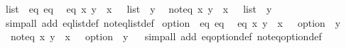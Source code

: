 \begin{isabellebody}
\endisatagproof
{\isafoldproof}%
%
\isadelimproof
%
\endisadelimproof
\isanewline
\isanewline
{}\isamarkupfalse%
\isanewline
\isanewline
{}\isamarkupfalse%
\ list\ {\isacharcolon}{\isacharcolon}\ {\isacharparenleft}eq{\isacharparenright}\ eq\isanewline
{}\isanewline
\isanewline
{}\isamarkupfalse%
\isanewline
\ \ {\isachardoublequoteopen}eq\ x\ y\ {\isasymlongleftrightarrow}\ {\isacharparenleft}x\ {\isacharcolon}{\isacharcolon}\ {\isacharunderscore}\ list{\isacharparenright}\ {\isacharequal}\ y{\isachardoublequoteclose}\isanewline
\isanewline
{}\isamarkupfalse%
\isanewline
\ \ {\isachardoublequoteopen}not{\isacharunderscore}eq\ x\ y\ {\isasymlongleftrightarrow}\ {\isacharparenleft}x\ {\isacharcolon}{\isacharcolon}\ {\isacharunderscore}\ list{\isacharparenright}\ {\isasymnoteq}\ y{\isachardoublequoteclose}\isanewline
\isanewline
{}\isamarkupfalse%
%
\isadelimproof
\ %
\endisadelimproof
%
\isatagproof
{}\isamarkupfalse%
\isanewline
{}\isamarkupfalse%
\ {\isacharparenleft}simp{\isacharunderscore}all\ add{\isacharcolon}\ eq{\isacharunderscore}list{\isacharunderscore}def\ not{\isacharunderscore}eq{\isacharunderscore}list{\isacharunderscore}def{\isacharparenright}%
\endisatagproof
{\isafoldproof}%
%
\isadelimproof
%
\endisadelimproof
\isanewline
\isanewline
{}\isamarkupfalse%
\isanewline
\isanewline
{}\isamarkupfalse%
\ option\ {\isacharcolon}{\isacharcolon}\ {\isacharparenleft}eq{\isacharparenright}\ eq\isanewline
{}\isanewline
\isanewline
{}\isamarkupfalse%
\isanewline
\ \ {\isachardoublequoteopen}eq\ x\ y\ {\isasymlongleftrightarrow}\ {\isacharparenleft}x\ {\isacharcolon}{\isacharcolon}\ {\isacharunderscore}\ option{\isacharparenright}\ {\isacharequal}\ y{\isachardoublequoteclose}\isanewline
\isanewline
{}\isamarkupfalse%
\isanewline
\ \ {\isachardoublequoteopen}not{\isacharunderscore}eq\ x\ y\ {\isasymlongleftrightarrow}\ {\isacharparenleft}x\ {\isacharcolon}{\isacharcolon}\ {\isacharunderscore}\ option{\isacharparenright}\ {\isasymnoteq}\ y{\isachardoublequoteclose}\isanewline
\isanewline
{}\isamarkupfalse%
%
\isadelimproof
\ %
\endisadelimproof
%
\isatagproof
{}\isamarkupfalse%
\isanewline
{}\isamarkupfalse%
\ {\isacharparenleft}simp{\isacharunderscore}all\ add{\isacharcolon}\ eq{\isacharunderscore}option{\isacharunderscore}def\ not{\isacharunderscore}eq{\isacharunderscore}option{\isacharunderscore}def{\isacharparenright}%

\end{isabellebody}

